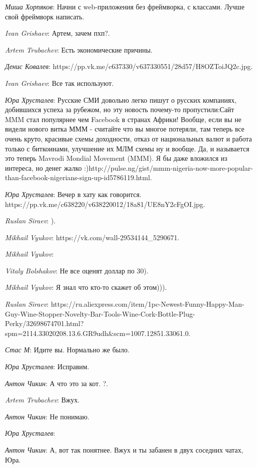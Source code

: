 \documentclass[10pt]{book}
\newcommand{\AUTHOR}[1]{\emph{#1}:}
\begin{document}
\AUTHOR{Миша Хорпяков} Начни с web-приложения без фреймворка, с классами. Лучше свой фреймворк написать.

\AUTHOR{Ivan Grishaev} Артем, зачем пхп?.

\AUTHOR{Artem Trubachev} Есть экономические причины.

\AUTHOR{Денис Ковалев} https://pp.vk.me/c637330/v637330551/28d57/H8OZToiJQ2c.jpg.

\AUTHOR{Ivan Grishaev} Все так используют.

\AUTHOR{Юра Хрусталев} Русские СМИ довольно легко пишут о русских компаниях, добившихся успеха за рубежом, но эту новость почему-то пропустили:Сайт MMM стал популярнее чем Facebook в странах Африки! Вообще, если вы не видели нового витка МММ - считайте что вы многое потеряли, там теперь все очень круто, красивые схемы доходности, отказ от национальных валют и работа только с биткоинами, улучшение их МЛМ схемы ну и вообще. Да, и называется это теперь Mavrodi Mondial Movement (MMM). Я бы даже вложился из интереса, но денег жалко :)http://pulse.ng/gist/mmm-nigeria-now-more-popular-than-facebook-nigerians-sign-up-id5786119.html.

\AUTHOR{Юра Хрусталев} Вечер в хату как говорится. https://pp.vk.me/c638220/v638220012/18a81/UE8nY2cFgOI.jpg.

\AUTHOR{Ruslan Siraev} ).

\AUTHOR{Mikhail Vyukov} https://vk.com/wall-29534144_5290671.

\AUTHOR{Mikhail Vyukov}

\AUTHOR{Vitaly Bolshakov} Не все оценят доллар по 30).

\AUTHOR{Mikhail Vyukov} Я знал что кто-то скажет об этом))).

\AUTHOR{Ruslan Siraev} https://ru.aliexpress.com/item/1pc-Newest-Funny-Happy-Man-Guy-Wine-Stopper-Novelty-Bar-Tools-Wine-Cork-Bottle-Plug-Perky/32698674701.html?spm=2114.33020208.13.6.GR9udh&scm=1007.12851.33061.0.

\AUTHOR{Стас М} Идите вы. Нормально же было.

\AUTHOR{Юра Хрусталев} Исправим.

\AUTHOR{Антон Чикин} А что это за кот. ?.

\AUTHOR{Artem Trubachev} Вжух.

\AUTHOR{Антон Чикин} Не понимаю.

\AUTHOR{Юра Хрусталев}

\AUTHOR{Антон Чикин} А, вот так понятнее. Вжух и ты забанен в двух соседних чатах, Юра.
\end{document}
